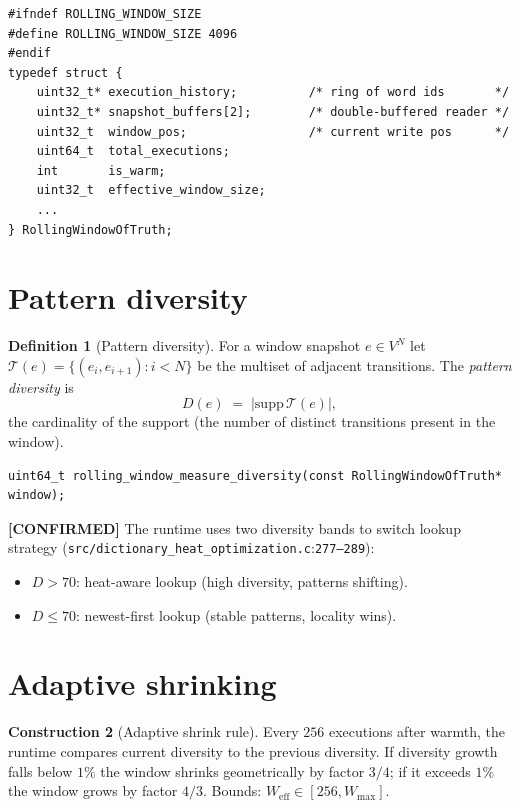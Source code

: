 \documentclass[11pt,letterpaper,openany]{book}
\theoremstyle{definition}
\newtheorem{definition}{Definition}[chapter]
\newtheorem{construction}[definition]{Construction}
\theoremstyle{plain}
\newcommand{\confirmed}{\textcolor{green!50!black}{\textbf{[CONFIRMED]}}\xspace}
\newcommand{\Wmax}{W_{\mathrm{max}}}
\newcommand{\sourceref}[2]{\texttt{#1}:\texttt{#2}}
\begin{document}
\begin{lstlisting}[caption={Rolling window state
  (\texttt{include/vm.h}:84--108).}]
#ifndef ROLLING_WINDOW_SIZE
#define ROLLING_WINDOW_SIZE 4096
#endif
typedef struct {
    uint32_t* execution_history;          /* ring of word ids       */
    uint32_t* snapshot_buffers[2];        /* double-buffered reader */
    uint32_t  window_pos;                 /* current write pos      */
    uint64_t  total_executions;
    int       is_warm;
    uint32_t  effective_window_size;
    ...
} RollingWindowOfTruth;
\end{lstlisting}

\section{Pattern diversity}

\begin{definition}[Pattern diversity]\label{def:diversity}
For a window snapshot $e\in V^{N}$ let $\mathcal{T}(e) = \{(e_i, e_{i+1}) : i < N\}$
be the multiset of adjacent transitions. The \emph{pattern diversity} is
\[
  D(e) \;=\; |\mathrm{supp}\,\mathcal{T}(e)|,
\]
the cardinality of the support (the number of distinct transitions
present in the window).
\end{definition}

\begin{lstlisting}[caption={Diversity counter (\texttt{rolling\_window\_of\_truth.h}:240--250).}]
uint64_t rolling_window_measure_diversity(const RollingWindowOfTruth* window);
\end{lstlisting}

\confirmed The runtime uses two diversity bands to switch lookup strategy
(\sourceref{src/dictionary\_heat\_optimization.c}{277--289}):
\begin{itemize}\setlength\itemsep{0pt}
  \item $D > 70$: heat-aware lookup (high diversity, patterns shifting).
  \item $D \le 70$: newest-first lookup (stable patterns, locality wins).
\end{itemize}

\section{Adaptive shrinking}

\begin{construction}[Adaptive shrink rule]\label{con:shrink}
Every $256$ executions after warmth, the runtime compares current diversity
to the previous diversity. If diversity growth falls below $1\%$ the window
shrinks geometrically by factor $3/4$; if it exceeds $1\%$ the window grows
by factor $4/3$. Bounds: $W_{\mathrm{eff}} \in [256, \Wmax]$.
\end{construction}
\end{document}
